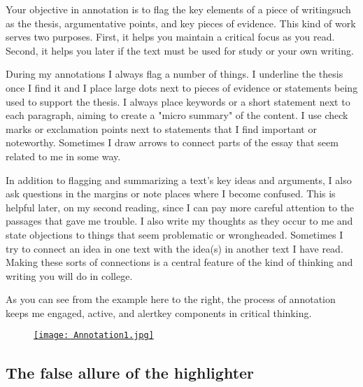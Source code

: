 Your objective in annotation is to flag the key elements of a piece of
writing\textemdash such as the thesis, argumentative points, and key pieces of
evidence. This kind of work serves two purposes. First, it helps you maintain a
critical focus as you read. Second, it helps you later if the text must be used for study or your own writing.

During my annotations I always flag a number of
things. I underline the thesis once I find it and I place large dots
next to pieces of evidence or statements being used to support the
thesis. I always place keywords or a short statement next to each paragraph,
aiming to create a "micro summary" of the content. I use check marks or
exclamation points next to statements that I find important or noteworthy.
Sometimes I draw arrows to connect parts of the essay that seem related to me in
some way.

In addition to flagging and summarizing a text's key ideas and arguments, I also ask
questions in the margins or note places where I become confused. This is helpful
later, on my second reading, since I can pay more careful attention to the
passages that gave me trouble. I also write my thoughts as they occur to me and
state objections to things that seem problematic or wrongheaded. Sometimes I try
to connect an idea in one text with the idea(s) in another text I have read. Making these sorts of connections is a central feature of the kind of thinking and writing you will do in college.

As you can see from the example here to the right, the process of annotation
keeps me engaged, active, and alert\textemdash key components in critical
thinking.

\begin{center} 
\begin{figure}
\href{https://github.com/stockphrase/OpenHandbook/blob/master/Chapters/images/Annotation1.jpg?raw=true}{\texttt{[image: Annotation1.jpg]}}
\end{figure}



\end{center}



\subsection{The false allure of the highlighter}


